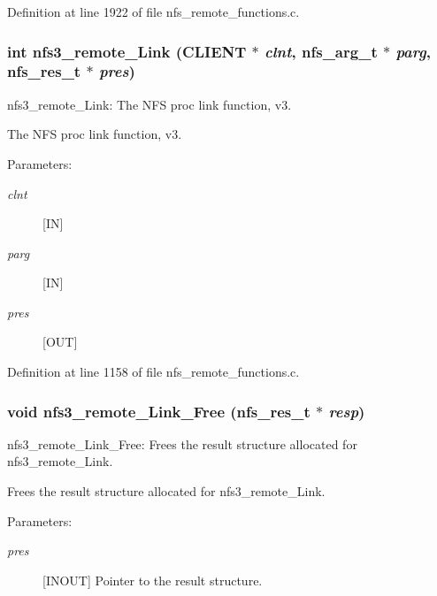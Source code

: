 Definition at line 1922 of file nfs\_\-remote\_\-functions.c.
\subsubsection[{nfs3\_\-remote\_\-Link}]{\setlength{\rightskip}{0pt plus 5cm}int nfs3\_\-remote\_\-Link (CLIENT $\ast$ {\em clnt}, \/  nfs\_\-arg\_\-t $\ast$ {\em parg}, \/  nfs\_\-res\_\-t $\ast$ {\em pres})}\label{group__NFSprocs_g8affac0a742b70688e87a63e3e6994f9}


nfs3\_\-remote\_\-Link: The NFS proc link function, v3.

The NFS proc link function, v3.

\begin{Desc}
\item[Parameters:]
\begin{description}
\item[{\em clnt}][IN] \item[{\em parg}][IN] \item[{\em pres}][OUT] \end{description}
\end{Desc}


Definition at line 1158 of file nfs\_\-remote\_\-functions.c.
\subsubsection[{nfs3\_\-remote\_\-Link\_\-Free}]{\setlength{\rightskip}{0pt plus 5cm}void nfs3\_\-remote\_\-Link\_\-Free (nfs\_\-res\_\-t $\ast$ {\em resp})}\label{group__NFSprocs_g7f9af32a3f7e4a479125890042d3455d}


nfs3\_\-remote\_\-Link\_\-Free: Frees the result structure allocated for nfs3\_\-remote\_\-Link.

Frees the result structure allocated for nfs3\_\-remote\_\-Link.

\begin{Desc}
\item[Parameters:]
\begin{description}
\item[{\em pres}][INOUT] Pointer to the result structure. \end{description}
\end{Desc}


